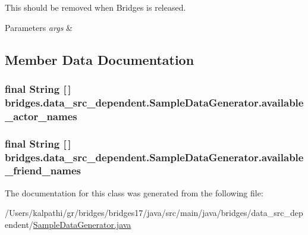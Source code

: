 This should be removed when Bridges is released. 
\begin{DoxyParams}{Parameters}
{\em args} & \\
\hline
\end{DoxyParams}


\subsection{Member Data Documentation}
\hypertarget{classbridges_1_1data__src__dependent_1_1_sample_data_generator_aac86cadaeb8859e94b6ed47a066cbbfc}{}
\subsubsection[{available\+\_\+actor\+\_\+names}]{\setlength{\rightskip}{0pt plus 5cm}final String \mbox{[}$\,$\mbox{]} bridges.\+data\+\_\+src\+\_\+dependent.\+Sample\+Data\+Generator.\+available\+\_\+actor\+\_\+names\hspace{0.3cm}{\ttfamily [static]}}\label{classbridges_1_1data__src__dependent_1_1_sample_data_generator_aac86cadaeb8859e94b6ed47a066cbbfc}
\hypertarget{classbridges_1_1data__src__dependent_1_1_sample_data_generator_a304c946018534a5a2b0049aace9d4472}{}
\subsubsection[{available\+\_\+friend\+\_\+names}]{\setlength{\rightskip}{0pt plus 5cm}final String \mbox{[}$\,$\mbox{]} bridges.\+data\+\_\+src\+\_\+dependent.\+Sample\+Data\+Generator.\+available\+\_\+friend\+\_\+names\hspace{0.3cm}{\ttfamily [static]}}\label{classbridges_1_1data__src__dependent_1_1_sample_data_generator_a304c946018534a5a2b0049aace9d4472}


The documentation for this class was generated from the following file\+:\begin{DoxyCompactItemize}
\item 
/\+Users/kalpathi/gr/bridges/bridges17/java/src/main/java/bridges/data\+\_\+src\+\_\+dependent/\hyperlink{_sample_data_generator_8java}{Sample\+Data\+Generator.\+java}\end{DoxyCompactItemize}
